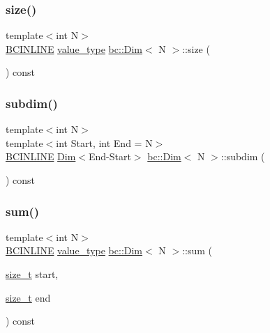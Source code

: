 \mbox{\label{structbc_1_1Dim_ab7d16a8f97fa578782efd3ffe9390da4}} 
\subsubsection{\texorpdfstring{size()}{size()}}
{\footnotesize\ttfamily template$<$int N$>$ \\
\hyperlink{common_8h_a6699e8b0449da5c0fafb878e59c1d4b1}{B\+C\+I\+N\+L\+I\+NE} \hyperlink{structbc_1_1Dim_af59ff554825273cf6bd9619b2c78c196}{value\+\_\+type} \hyperlink{structbc_1_1Dim}{bc\+::\+Dim}$<$ N $>$\+::size (\begin{DoxyParamCaption}{ }\end{DoxyParamCaption}) const\hspace{0.3cm}{\ttfamily [inline]}}

\mbox{\label{structbc_1_1Dim_a3f58e386c1ed1adf4b1a23ba35f7ac7f}} 
\subsubsection{\texorpdfstring{subdim()}{subdim()}}
{\footnotesize\ttfamily template$<$int N$>$ \\
template$<$int Start, int End = N$>$ \\
\hyperlink{common_8h_a6699e8b0449da5c0fafb878e59c1d4b1}{B\+C\+I\+N\+L\+I\+NE} \hyperlink{structbc_1_1Dim}{Dim}$<$End-\/Start$>$ \hyperlink{structbc_1_1Dim}{bc\+::\+Dim}$<$ N $>$\+::subdim (\begin{DoxyParamCaption}{ }\end{DoxyParamCaption}) const\hspace{0.3cm}{\ttfamily [inline]}}

\mbox{\label{structbc_1_1Dim_af29ea90988a60052b9d1892ca517f634}} 
\subsubsection{\texorpdfstring{sum()}{sum()}\hspace{0.1cm}{\footnotesize\ttfamily [1/2]}}
{\footnotesize\ttfamily template$<$int N$>$ \\
\hyperlink{common_8h_a6699e8b0449da5c0fafb878e59c1d4b1}{B\+C\+I\+N\+L\+I\+NE} \hyperlink{structbc_1_1Dim_af59ff554825273cf6bd9619b2c78c196}{value\+\_\+type} \hyperlink{structbc_1_1Dim}{bc\+::\+Dim}$<$ N $>$\+::sum (\begin{DoxyParamCaption}\item[{\hyperlink{structbc_1_1Dim_a8c7c7ae0cd96c3923e76097089747290}{size\+\_\+t}}]{start,  }\item[{\hyperlink{structbc_1_1Dim_a8c7c7ae0cd96c3923e76097089747290}{size\+\_\+t}}]{end }\end{DoxyParamCaption}) const\hspace{0.3cm}{\ttfamily [inline]}}

